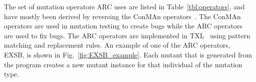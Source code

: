 The set of mutation operators ARC uses are listed in Table~\ref{tbl:operators},
and have mostly been derived by reversing the ConMAn operators~\cite{BCD06}. The ConMAn operators are used in mutation testing to create bugs while the ARC operators are used to fix bugs. The ARC operators are implemented in 
TXL~\cite{CHP91} using pattern matching and replacement rules. An example of one of the ARC operators, 
EXSB, is shown in Fig.~\ref{fig:EXSB_example}. Each mutant
that is generated from the program creates a new mutant instance for that
individual of the mutation type.




